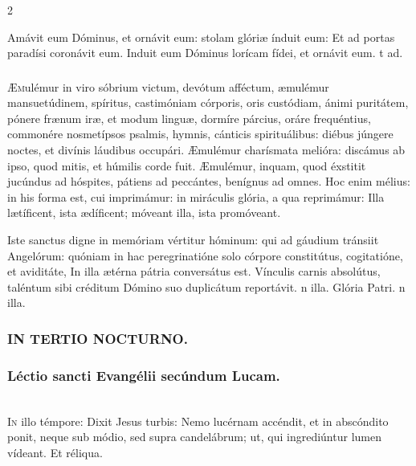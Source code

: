 \documentclass[9pt,twoside]{extarticle}
\begin{document}
\begin{multicols}{2}
\begin{tightlist}{}
\item {} Amávit eum Dóminus, et ornávit eum: stolam glóriæ índuit eum: \textred{*} Et ad portas paradísi coronávit eum.  Induit eum Dóminus lorícam fídei, et ornávit eum. t ad.
\end{tightlist}

\subsubsection*{\center{}}
\lettrine{Æ}mulémur in viro sóbrium victum, devótum afféctum, æmulémur mansuetúdinem, spíritus, castimóniam córporis, oris custódiam, ánimi puritátem, pónere frænum iræ, et modum linguæ, dormíre párcius, oráre frequéntius, commonére nosmetípsos psalmis, hymnis, cánticis spirituálibus: diébus júngere noctes, et divínis láudibus occupári. Æmulémur charísmata melióra: discámus ab ipso, quod mitis, et húmilis corde fuit. Æmulémur, inquam, quod éxstitit jucúndus ad hóspites, pátiens ad peccántes, benígnus ad omnes. Hoc enim mélius: in his forma est, cui imprimámur: in miráculis glória, a qua reprimámur: Illa lætíficent, ista ædíficent; móveant illa, ista promóveant.

\begin{tightlist}{}
\item {} Iste sanctus digne in memóriam vértitur hóminum: qui ad gáudium tránsiit Angelórum: quóniam in hac peregrinatióne solo córpore constitútus, cogitatióne, et aviditáte, \textred{*} In illa ætérna pátria conversátus est.  Vínculis carnis absolútus, taléntum sibi créditum Dómino suo duplicátum reportávit. n illa. Glória Patri. n illa.
\end{tightlist}

\subsubsection*{\center \textsc{IN TERTIO NOCTURNO.}}
\subsubsection*{\center Léctio sancti Evangélii secúndum Lucam.}
\\

\lettrine{I}n illo témpore: Dixit Jesus turbis: Nemo lucérnam accéndit, et in abscóndito ponit, neque sub módio, sed supra candelábrum; ut, qui ingrediúntur lumen vídeant. Et réliqua.


\end{multicols}
\end{document}
